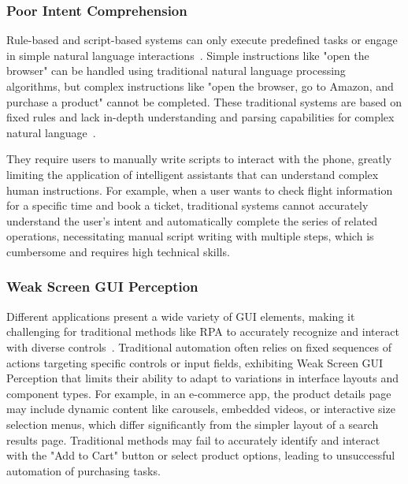 \subsubsection{Poor Intent Comprehension}

Rule-based and script-based systems can only execute predefined tasks or engage in simple natural language interactions~\cite{kepuska2018next,cowan2017can}. Simple instructions like "open the browser" can be handled using traditional natural language processing algorithms, but complex instructions like "open the browser, go to Amazon, and purchase a product" cannot be completed. These traditional systems are based on fixed rules and lack in-depth understanding and parsing capabilities for complex natural language~\cite{anicic2010rule,kang2013using,karanikolas2023large}.

They require users to manually write scripts to interact with the phone, greatly limiting the application of intelligent assistants that can understand complex human instructions. For example, when a user wants to check flight information for a specific time and book a ticket, traditional systems cannot accurately understand the user's intent and automatically complete the series of related operations, necessitating manual script writing with multiple steps, which is cumbersome and requires high technical skills.

\subsubsection{Weak Screen GUI Perception}

Different applications present a wide variety of GUI elements, making it challenging for traditional methods like RPA to accurately recognize and interact with diverse controls~\cite{fu2024understanding,banerjee2013graphical,chen2018ui,brich2017exploring}. Traditional automation often relies on fixed sequences of actions targeting specific controls or input fields, exhibiting Weak Screen GUI Perception that limits their ability to adapt to variations in interface layouts and component types. For example, in an e-commerce app, the product details page may include dynamic content like carousels, embedded videos, or interactive size selection menus, which differ significantly from the simpler layout of a search results page. Traditional methods may fail to accurately identify and interact with the "Add to Cart" button or select product options, leading to unsuccessful automation of purchasing tasks.


